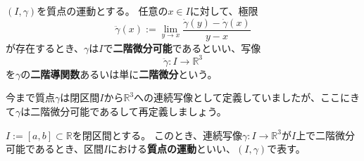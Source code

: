 \begin{definition}
  $(I,\gamma)$を質点の運動とする。
  任意の$x\in I$に対して、極限
  \[
    \ddot\gamma(x):=\lim_{y\to x}\frac{\dot\gamma(y)-\dot\gamma(x)}{y-x}
  \]
  が存在するとき、$\gamma$は$I$で\textbf{二階微分可能}であるといい、写像
  \[
    \ddot\gamma:I\to\mathbb{R}^3
  \]
  を$\gamma$の\textbf{二階導関数}あるいは単に\textbf{二階微分}という。
\end{definition}

今まで質点$\gamma$は閉区間$I$から$\mathbb{R}^3$への連続写像として定義していましたが、ここにきて$\gamma$は二階微分可能であるして再定義しましょう。
\begin{definition}
  $I:=[a,b]\subset\mathbb{R}$を閉区間とする。
  このとき、連続写像$\gamma:I\to\mathbb{R}^3$が$I$上で二階微分可能であるとき、区間$I$における\textbf{質点の運動}といい、$(I,\gamma)$で表す。
\end{definition}










